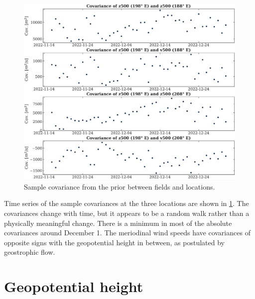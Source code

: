 \documentclass[parskip=half,DIV=16]{scrartcl}
\begin{document}
\begin{figure}[h]
   \centering
   \includegraphics[width=\textwidth]{figures/cov.pdf}
   \caption{Sample covariance from the prior between fields and locations.}
   \label{fig:covs}
\end{figure}

Time series of the sample covariances at the three locations are shown in \cref{fig:covs}. The covariances change with time, but it appears to be a random walk rather than a physically meaningful change. There is a minimum in most of the absolute covariances around December 1. The meriodinal wind speeds have covariances of opposite signs with the geopotential height in between, as postulated by geostrophic flow.



\newpage
\section{Geopotential height}
\end{document}
